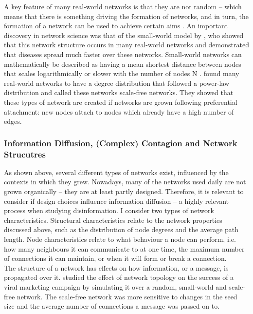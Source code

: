 \documentclass[10pt,a4paper]{article}
\begin{document}
A key feature of many real-world networks is that they are not random – which means that there is something driving the formation of networks, and in turn, the formation of a network can be used to achieve certain aims \citep{Newman2003}. An important discovery in network science was that of the small-world model by \cite{Watts1998}, who showed that this network structure occurs in many real-world networks and demonstrated that diseases spread much faster over these networks. Small-world networks can mathematically be described as having a mean shortest distance between nodes that scales logarithmically or slower with the number of nodes N \citep{Newman2003}. 
\cite{Barabasi1999} found many real-world networks to have a degree distribution that followed a power-law distribution and called these networks scale-free networks. They showed that these types of network are created if networks are grown following preferential attachment: new nodes attach to nodes which already have a high number of edges.


\subsubsection{Information Diffusion, (Complex) Contagion and Network Strucutres}
As shown above, several different types of networks exist, influenced by the contexts in which they grew. Nowadays, many of the networks used daily are not grown organically – they are at least partly designed. Therefore, it is relevant to consider if design choices influence information diffusion – a highly relevant process when studying disinformation. I consider two types of network characteristics. Structural characteristics relate to the network properties discussed above, such as the distribution of node degrees and the average path length. Node characteristics relate to what behaviour a node can perform, i.e. how many neighbours it can communicate to at one time, the maximum number of connections it can maintain, or when it will form or break a connection. \\

The structure of a network has effects on how information, or a message, is propagated over it. \cite{Bampo2008} studied the effect of network topology on the success of a viral marketing campaign by simulating it over a random, small-world and scale-free network. The scale-free network was more sensitive to changes in the seed size and the average number of connections a message was passed on to.  \\
\end{document}
